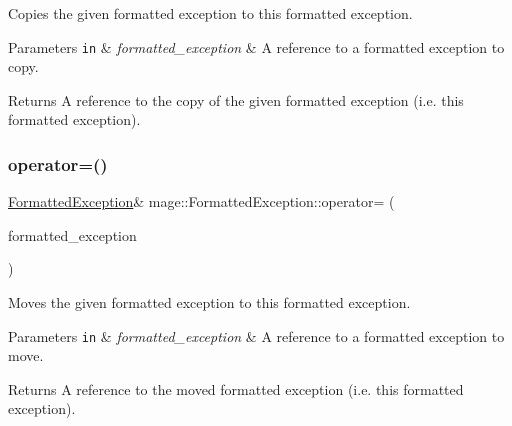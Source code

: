 Copies the given formatted exception to this formatted exception.


\begin{DoxyParams}[1]{Parameters}
\mbox{\tt in}  & {\em formatted\+\_\+exception} & A reference to a formatted exception to copy. \\
\hline
\end{DoxyParams}
\begin{DoxyReturn}{Returns}
A reference to the copy of the given formatted exception (i.\+e. this formatted exception). 
\end{DoxyReturn}
\hypertarget{structmage_1_1_formatted_exception_ae35ad9e81efe8ed385792854036b4a14}{}\label{structmage_1_1_formatted_exception_ae35ad9e81efe8ed385792854036b4a14} 
\subsubsection{\texorpdfstring{operator=()}{operator=()}\hspace{0.1cm}{\footnotesize\ttfamily [2/2]}}
{\footnotesize\ttfamily \hyperlink{structmage_1_1_formatted_exception}{Formatted\+Exception}\& mage\+::\+Formatted\+Exception\+::operator= (\begin{DoxyParamCaption}\item[{\hyperlink{structmage_1_1_formatted_exception}{Formatted\+Exception} \&\&}]{formatted\+\_\+exception }\end{DoxyParamCaption})\hspace{0.3cm}{\ttfamily [default]}}

Moves the given formatted exception to this formatted exception.


\begin{DoxyParams}[1]{Parameters}
\mbox{\tt in}  & {\em formatted\+\_\+exception} & A reference to a formatted exception to move. \\
\hline
\end{DoxyParams}
\begin{DoxyReturn}{Returns}
A reference to the moved formatted exception (i.\+e. this formatted exception). 
\end{DoxyReturn}
\hypertarget{structmage_1_1_formatted_exception_af4a63770e4f7091868d9e1e2382c1e70}{}\label{structmage_1_1_formatted_exception_af4a63770e4f7091868d9e1e2382c1e70} 
